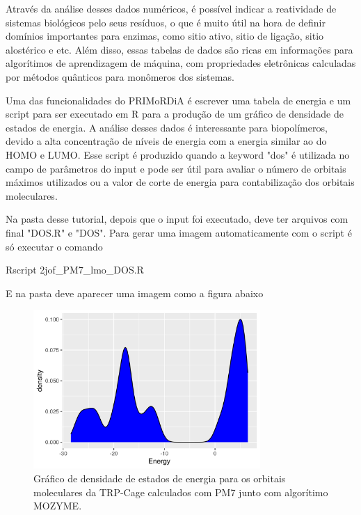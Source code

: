 \documentclass[a4paper,11pt]{refart}
\begin{document}
Através da análise desses dados numéricos, é possível indicar a reatividade de sistemas biológicos pelo seus resíduos, o que é muito útil na hora de definir domínios importantes para enzimas, como sitio ativo, sitio de ligação, sitio alostérico e etc. Além disso, essas tabelas de dados são ricas em informações para algorítimos de aprendizagem de máquina, com propriedades eletrônicas calculadas por métodos quânticos para monômeros dos sistemas. 

Uma das funcionalidades do PRIMoRDiA é escrever uma tabela de energia e um script para ser executado em R para a produção de um gráfico de densidade de estados de energia. A análise desses dados é interessante para biopolímeros, devido a alta concentração de níveis de energia com a energia similar ao do HOMO e LUMO. Esse script é produzido quando a keyword "dos" é utilizada no campo de parâmetros do input e pode ser útil para avaliar o número de orbitais máximos utilizados ou a valor de corte de energia para contabilização dos orbitais moleculares.

Na pasta desse tutorial, depois que o input foi executado, deve ter arquivos com final "DOS.R" e "DOS". Para gerar uma imagem automaticamente com o script é só executar o comando

\hspace*{-\leftmarginwidth}
\begin{minipage}{\fullwidth}
	\begin{commandshell}Rscript 2jof_PM7_lmo_DOS.R\end{commandshell}
\end{minipage}

E na pasta deve aparecer uma imagem como a figura abaixo

\hspace*{-\leftmarginwidth}
\begin{minipage}{\fullwidth}
	\begin{figure}[H]
		\begin{center}
			\includegraphics[width=3.4in]{images/tut3_img31}
			\caption{Gráfico de densidade de estados de energia para os orbitais moleculares da TRP-Cage calculados com PM7 junto com algorítimo MOZYME.}
			\label{fig_tut3_30}
		\end{center}
	\end{figure}
\end{minipage}
\end{document}
